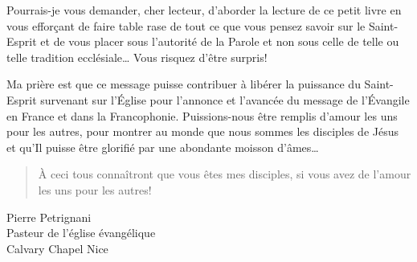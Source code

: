 \begin{preface}
Pourrais-je vous demander, cher lecteur, d'aborder la lecture de ce petit livre en vous efforçant de faire
 table rase de tout ce que vous pensez savoir sur le Saint-Esprit et de vous placer sous l'autorité de la Parole
 et non sous celle de telle ou telle tradition ecclésiale\dots{} Vous risquez d'être surpris!

Ma prière est que ce message puisse contribuer à libérer \Og la puissance du Saint-Esprit survenant sur l'\'Eglise \Fg{}
 pour l'annonce et l'avancée du message de l'\'Evangile en France et dans la Francophonie.
 Puissions-nous être remplis d'amour les uns pour les autres,
 pour montrer au monde que nous sommes les disciples de Jésus
 et qu'Il puisse être glorifié par une abondante moisson d'âmes\dots{}

\begin{quote}
\Og \`A ceci tous connaîtront que vous êtes mes disciples,
 si vous avez de l'amour les uns pour les autres! \Fg{}
\end{quote}

\begin{flushright}
Pierre Petrignani\\
Pasteur de l'église évangélique\\
\Og Calvary Chapel Nice \Fg
\end{flushright}


\end{preface}


